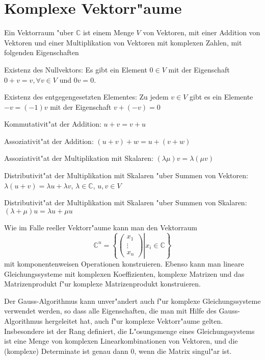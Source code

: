 \section{Komplexe Vektorr"aume}
Ein Vektorraum "uber $\mathbb C$ ist einem Menge $V$ von Vektoren, mit
einer Addition von Vektoren und einer Multiplikation von Vektoren mit
komplexen Zahlen, mit folgenden Eigenschaften
\begin{compactenum}
\item Existenz des Nullvektors: Es gibt ein Element $0\in V$ mit der
Eigenschaft $0+v=v,\forall v\in V$ und $0v=0$.
\item Existenz des entgegengesetzten Elementes:
Zu jedem $v\in V$ gibt es ein Elemente $-v=(-1)v$ mit der Eigenschaft
$v+(-v)=0$
\item Kommutativit"at der Addition: $u+v=v+u$
\item Assoziativit"at der Addition: $(u+v)+w=u+(v+w)$
\item Assoziativit"at der Multiplikation mit Skalaren:
$(\lambda\mu)v=\lambda (\mu v)$
\item Distributivit"at der Multiplikation mit Skalaren "uber Summen von Vektoren: $\lambda(u+v)=\lambda u+ \lambda v$, $\lambda\in\mathbb C$, $u,v\in V$
\item Distributivit"at der Multiplikation mit Skalaren "uber Summen von Skalaren: $(\lambda+\mu)u=\lambda u+\mu u$
\end{compactenum}
Wie im Falle reeller Vektorr"aume kann man den Vektorraum
\[
{\mathbb C}^n = \left\{\left .
\begin{pmatrix}x_1\\\vdots\\x_n\end{pmatrix}
\right|
x_i\in\mathbb C
\right\}
\]
mit komponentenweisen Operationen konstruieren.
Ebenso kann man lineare Gleichungssysteme mit komplexen Koeffizienten,
komplexe Matrizen und das Matrizenprodukt f"ur komplexe Matrizenprodukt
konstruieren.

Der Gauss-Algorithmus kann unver"andert auch f"ur komplexe Gleichungssysteme
verwendet werden, so dass alle Eigenschaften, die man mit Hilfe des
Gauss-Algorithmus hergeleitet hat, auch f"ur komplexe Vektorr"aume
gelten.
Insbesondere ist der Rang definiert, die L"osungsmenge
eines Gleichungssystems ist eine Menge von komplexen Linearkombinationen
von Vektoren, und die (komplexe) Determinate ist genau dann 0, wenn
die Matrix singul"ar ist.

